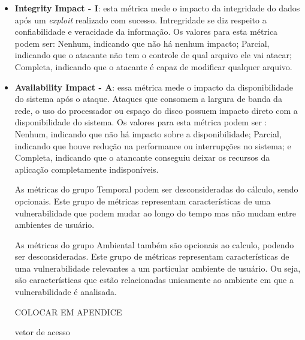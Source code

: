\begin{itemize}
\item \textbf{Integrity Impact - I}: esta métrica mede o impacto da integridade do dados após um \emph{exploit} realizado com sucesso. Intregridade se diz respeito a confiabilidade e veracidade da informação. Os valores para esta métrica podem ser: Nenhum, indicando que não há nenhum impacto; Parcial, indicando que o atacante não tem o controle de qual arquivo ele vai atacar; Completa, indicando que o atacante é capaz de modificar qualquer arquivo.
	

\item \textbf{Availability Impact - A}: essa métrica mede o impacto da disponibilidade do sistema após o ataque. Ataques que consomem a largura de banda da rede, o uso do processador ou espaço do disco possuem impacto direto com a disponibilidade do sistema. Os valores para esta métrica podem ser : Nenhum, indicando que não há impacto sobre a disponibilidade; Parcial, indicando que houve redução na performance ou interrupções no sistema; e Completa, indicando que o atancante conseguiu deixar os recursos da aplicação completamente indisponíveis.


%
As métricas do grupo Temporal podem ser desconsideradas do cálculo, sendo opcionais. Este grupo de métricas representam características de uma vulnerabilidade que podem mudar ao longo do tempo mas não mudam entre ambientes de usuário.



%

As métricas do grupo Ambiental também são opcionais ao calculo, podendo ser desconsideradas. Este grupo de métricas representam características de uma vulnerabilidade relevantes a um particular ambiente de usuário. Ou seja, são características que estão relacionadas unicamente ao ambiente em que a vulnerabilidade é analisada.
%  

%


COLOCAR EM APENDICE

vetor de acesso


\end{itemize}
